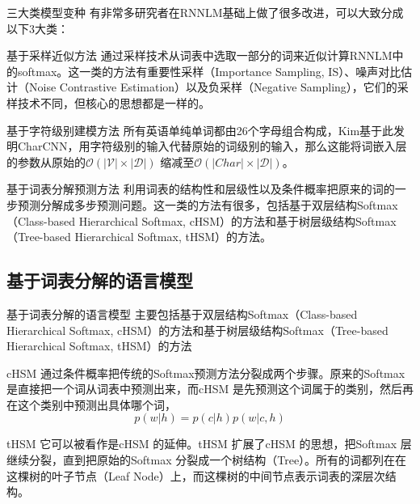 \documentclass[14pt]{Bredelebeamer}
\begin{document}
\begin{frame}{三大类模型变种}
    有非常多研究者在RNNLM基础上做了很多改进，可以大致分成以下3大类：
    \pause
    \begin{block}{基于采样近似方法}
    通过采样技术从词表中选取一部分的词来近似计算RNNLM中的softmax。这一类的方法有重要性采样（Importance Sampling, IS）、噪声对比估计（Noise Contrastive Estimation）以及负采样（Negative Sampling），它们的采样技术不同，但核心的思想都是一样的。
    \end{block}
    \pause
    \begin{block}{基于字符级别建模方法}
    所有英语单纯单词都由26个字母组合构成，Kim基于此发明CharCNN，用字符级别的输入代替原始的词级别的输入，那么这能将词嵌入层的参数从原始的${\mathcal{O}(|\mathcal{V}| \times |\mathcal{D}|)}$ 缩减至${\mathcal{O}(|Char| \times |\mathcal{D}|)}$。
    \end{block}
    \pause
    \begin{block}{基于词表分解预测方法}
    利用词表的结构性和层级性以及条件概率把原来的词的一步预测分解成多步预测问题。这一类的方法有很多，包括基于双层结构Softmax（Class-based Hierarchical Softmax, cHSM）的方法和基于树层级结构Softmax（Tree-based Hierarchical Softmax, tHSM）的方法。
    \end{block}

\end{frame}

\subsection{基于词表分解的语言模型}

\begin{frame}{基于词表分解的语言模型}
    主要包括基于双层结构Softmax（Class-based Hierarchical Softmax, cHSM）的方法和基于树层级结构Softmax（Tree-based Hierarchical Softmax, tHSM）的方法
    \pause
    \begin{block}{cHSM}
    通过条件概率把传统的Softmax预测方法分裂成两个步骤。原来的Softmax 是直接把一个词从词表中预测出来，而cHSM 是先预测这个词属于的类别，然后再在这个类别中预测出具体哪个词，
    \begin{equation}
    \label{eq:cHSM}
	p(w|h)=p(c|h)p(w|c,h)
    \end{equation}

    \end{block}
    \pause
    \begin{block}{tHSM}
    它可以被看作是cHSM 的延伸。tHSM 扩展了cHSM 的思想，把Softmax 层继续分裂，直到把原始的Softmax 分裂成一个树结构（Tree）。所有的词都列在在这棵树的叶子节点（Leaf Node）上，而这棵树的中间节点表示词表的深层次结构。
    \end{block}
\end{frame}
\end{document}
